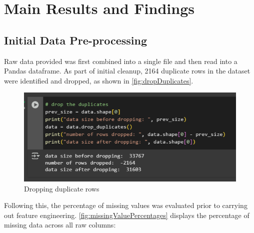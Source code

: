 \section{Main Results and Findings}\label{sec:mainResults}

\subsection{Initial Data Pre-processing}
\noindent Raw data provided was first combined into a single file and then read into a Pandas dataframe. As part of initial cleanup, 2164 duplicate rows in the dataset were identified and dropped, as shown in \autoref{fig:dropDuplicates}. 

\begin{figure}[H]
		\centering
		\includegraphics[scale=0.8]{figures/python_code/drop_duplicate_rows.png}
		\caption{Dropping duplicate rows}
		\label{fig:dropDuplicates}
\end{figure}

\noindent Following this, the percentage of missing values was evaluated prior to carrying out feature engineering. \autoref{fig:missingValuePercentages} displays the percentage of missing data across all raw columns:

